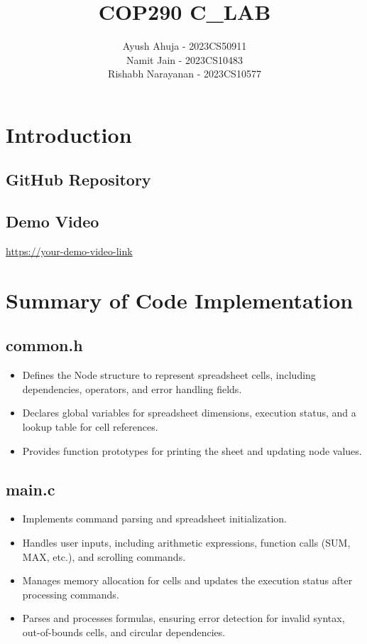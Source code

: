 \documentclass{article}
\title{\LARGE COP290 C\_LAB}
\author{
    Ayush Ahuja - 2023CS50911\\
    Namit Jain - 2023CS10483\\
    Rishabh Narayanan - 2023CS10577
}
\date{}
\begin{document}
\maketitle

\section{Introduction}

\subsection{GitHub Repository}

\subsection{Demo Video}
\url{https://your-demo-video-link}


\section{Summary of Code Implementation}

\singlespacing %

\subsection{common.h}
\begin{itemize}
    \item Defines the Node structure to represent spreadsheet cells, including dependencies, operators, and error handling fields.
    \item Declares global variables for spreadsheet dimensions, execution status, and a lookup table for cell references.
    \item Provides function prototypes for printing the sheet and updating node values.
\end{itemize}

\subsection{main.c}
\begin{itemize}
    \item Implements command parsing and spreadsheet initialization.
    \item Handles user inputs, including arithmetic expressions, function calls (SUM, MAX, etc.), and scrolling commands.
    \item Manages memory allocation for cells and updates the execution status after processing commands.
    \item Parses and processes formulas, ensuring error detection for invalid syntax, out-of-bounds cells, and circular dependencies.
\end{itemize}
\end{document}
